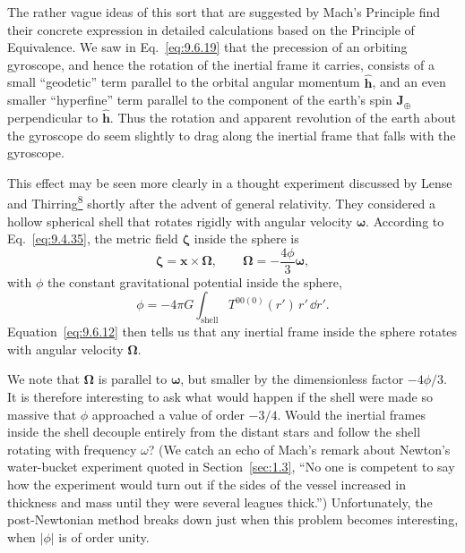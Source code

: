 The rather vague ideas of this sort that are suggested by Mach's Principle
find their concrete expression in detailed calculations based on the
Principle of Equivalence. We saw in Eq.~\eqref{eq:9.6.19} that the
precession of an orbiting gyroscope, and hence the rotation of the inertial
frame it carries, consists of a small ``geodetic'' term parallel to the
orbital angular momentum \(\widehat{\mathbf h}\), and an even smaller
``hyperfine'' term parallel to the component of the earth's spin
\(\mathbf J_\oplus\) perpendicular to \(\widehat{\mathbf h}\). Thus the
rotation and apparent revolution of the earth about the gyroscope do seem
slightly to drag along the inertial frame that falls with the gyroscope.

This effect may be seen more clearly in a thought experiment discussed by
Lense and Thirring\hyperref[ch9-ref-8]{\textsuperscript{8}} shortly after
the advent of general relativity. They considered a hollow spherical shell
that rotates rigidly with angular velocity \(\boldsymbol\omega\). According
to Eq.~\eqref{eq:9.4.35}, the metric field \(\boldsymbol\zeta\) inside the
sphere is
\[
  \boldsymbol\zeta=\mathbf x\times\boldsymbol\Omega,
  \qquad
  \boldsymbol\Omega=-\frac{4\phi}{3}\boldsymbol\omega,
\]
with \(\phi\) the constant gravitational potential inside the sphere,
\[
  \phi
  =
  -4\pi G\int_{\mathrm{shell}}
  T^{00(0)}(r')\,r'\,\dd r'.
\]
Equation~\eqref{eq:9.6.12} then tells us that any inertial frame inside the
sphere rotates with angular velocity \(\boldsymbol\Omega\).

We note that \(\boldsymbol\Omega\) is parallel to \(\boldsymbol\omega\),
but smaller by the dimensionless factor \(-4\phi/3\). It is therefore
interesting to ask what would happen if the shell were made so massive that
\(\phi\) approached a value of order \(-3/4\). Would the inertial frames
inside the shell decouple entirely from the distant stars and follow the
shell rotating with frequency \(\omega\)? (We catch an echo of Mach's
remark about Newton's water-bucket experiment quoted in
Section~\ref{sec:1.3}, ``No one is competent to say how the experiment
would turn out if the sides of the vessel increased in thickness and mass
until they were several leagues thick.'') Unfortunately, the
post-Newtonian method breaks down just when this problem becomes
interesting, when \(|\phi|\) is of order unity.

